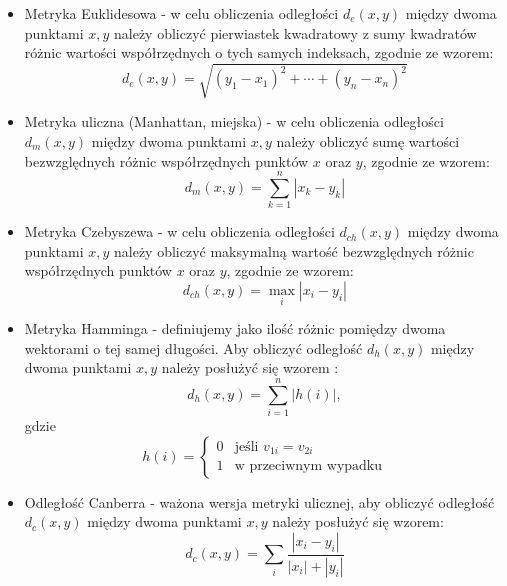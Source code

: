 \documentclass{classrep}
\begin{document}
\begin{itemize}[label=$\bullet$\scshape\bfseries]

\item Metryka Euklidesowa - w celu obliczenia odległości $ d_{e}(x,y) $ między dwoma punktami $ x, y $ należy obliczyć pierwiastek kwadratowy z sumy kwadratów różnic wartości współrzędnych o tych samych indeksach, zgodnie ze wzorem:
\begin{equation}
d_{e}(x,y)= \sqrt{ (y_{1} - x_{1})^2 + \cdots + (y_{n} - x_{n})^2 }
\end{equation}

\item Metryka uliczna (Manhattan, miejska) - w celu obliczenia odległości $ d_{m}(x,y) $ między dwoma punktami $ x, y $ należy obliczyć sumę wartości bezwzględnych różnic współrzędnych punktów $ x $ oraz $ y $, zgodnie ze wzorem:
\begin{equation}
d_{m}(x,y)= \sum_{k=1}^{n} | x_{k} - y_{k} |
\end{equation}

\item Metryka Czebyszewa - w celu obliczenia odległości $ d_{ch}(x,y) $ między dwoma punktami $ x, y $ należy obliczyć maksymalną wartość bezwzględnych różnic współrzędnych punktów $ x $ oraz $ y $, zgodnie ze wzorem:
\begin{equation}
d_{ch}(x,y)= \max_{i} |x_{i} - y_{i}|
\end{equation}

\item Metryka Hamminga - definiujemy jako ilość różnic pomiędzy dwoma wektorami o tej samej długości. Aby obliczyć odległość $ d_{h}(x,y) $ między dwoma punktami $ x, y $ należy posłużyć się wzorem \cite{wyklad} :
\begin{equation}
d_{h}(x,y)= \sum_{i=1}^{n} |h(i)|,
\end{equation}
gdzie 
\begin{equation}
h(i)= \left\{ \begin{array}{ll}
0 & \textrm{jeśli $v_{1i}=v_{2i}$}\\
1 & \textrm{w przeciwnym wypadku}
\end{array} \right.
\end{equation}

\item Odległość Canberra - ważona wersja metryki ulicznej, aby obliczyć odległość $ d_{c}(x,y) $ między dwoma punktami $ x, y $ należy posłużyć się wzorem:
\begin{equation}
d_{c}(x,y)= \sum_{i} \frac{|x_{i} - y_{i}|}{|x_{i}| + |y_{i}|}
\end{equation}

\end{itemize}
\end{document}
